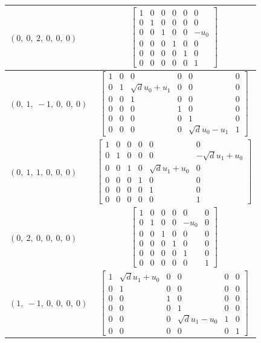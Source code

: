 \documentclass[11pt]{article}
\theoremstyle{definition}
\begin{document}
\begin{longtable}{|l|c|}
    \hline
    $\left( 0, \  0, \  2, \  0, \  0, \  0\right)$ & ${\left[\begin{matrix}1 & 0 & 0 & 0 & 0 & 0\\0 & 1 & 0 & 0 & 0 & 0\\0 & 0 & 1 & 0 & 0 & - u_{0}\\0 & 0 & 0 & 1 & 0 & 0\\0 & 0 & 0 & 0 & 1 & 0\\0 & 0 & 0 & 0 & 0 & 1\end{matrix}\right]}$ \\
    \hline
    $\left( 0, \  1, \  -1, \  0, \  0, \  0\right)$ & ${\left[\begin{matrix}1 & 0 & 0 & 0 & 0 & 0\\0 & 1 & \sqrt{d} u_{0} + u_{1} & 0 & 0 & 0\\0 & 0 & 1 & 0 & 0 & 0\\0 & 0 & 0 & 1 & 0 & 0\\0 & 0 & 0 & 0 & 1 & 0\\0 & 0 & 0 & 0 & \sqrt{d} u_{0} - u_{1} & 1\end{matrix}\right]}$ \\
    \hline
    $\left( 0, \  1, \  1, \  0, \  0, \  0\right)$ & ${\left[\begin{matrix}1 & 0 & 0 & 0 & 0 & 0\\0 & 1 & 0 & 0 & 0 & - \sqrt{d} u_{1} + u_{0}\\0 & 0 & 1 & 0 & \sqrt{d} u_{1} + u_{0} & 0\\0 & 0 & 0 & 1 & 0 & 0\\0 & 0 & 0 & 0 & 1 & 0\\0 & 0 & 0 & 0 & 0 & 1\end{matrix}\right]}$ \\
    \hline
    $\left( 0, \  2, \  0, \  0, \  0, \  0\right)$ & ${\left[\begin{matrix}1 & 0 & 0 & 0 & 0 & 0\\0 & 1 & 0 & 0 & - u_{0} & 0\\0 & 0 & 1 & 0 & 0 & 0\\0 & 0 & 0 & 1 & 0 & 0\\0 & 0 & 0 & 0 & 1 & 0\\0 & 0 & 0 & 0 & 0 & 1\end{matrix}\right]}$ \\
    \hline
    $\left( 1, \  -1, \  0, \  0, \  0, \  0\right)$ & ${\left[\begin{matrix}1 & \sqrt{d} u_{1} + u_{0} & 0 & 0 & 0 & 0\\0 & 1 & 0 & 0 & 0 & 0\\0 & 0 & 1 & 0 & 0 & 0\\0 & 0 & 0 & 1 & 0 & 0\\0 & 0 & 0 & \sqrt{d} u_{1} - u_{0} & 1 & 0\\0 & 0 & 0 & 0 & 0 & 1\end{matrix}\right]}$ \\

\end{longtable}
\end{document}
